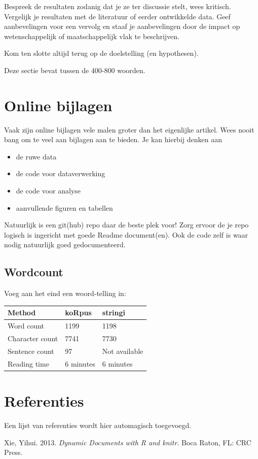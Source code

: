\documentclass[
]{article}
\providecommand{\tightlist}{%
  \setlength{\itemsep}{0pt}\setlength{\parskip}{0pt}}
\newlength{\cslhangindent}
\newlength{\cslentryspacingunit} %
\newenvironment{CSLReferences}[2] %
 {%
  \setlength{\parindent}{0pt}
  \ifodd #1
  \let\oldpar\par
  \def\par{\hangindent=\cslhangindent\oldpar}
  \fi
  \setlength{\parskip}{#2\cslentryspacingunit}
 }%
 {}
\begin{document}
Bespreek de resultaten zodanig dat je ze ter discussie stelt, wees kritisch. Vergelijk je resultaten met de literatuur of eerder ontwikkelde data. Geef aanbevelingen voor een vervolg en staaf je aanbevelingen door de impact op wetenschappelijk of maatschappelijk vlak te beschrijven.

Kom ten slotte altijd terug op de doelstelling (en hypothesen).

Deze sectie bevat tussen de 400-800 woorden.

\hypertarget{online-bijlagen}{%
\section{Online bijlagen}\label{online-bijlagen}}

Vaak zijn online bijlagen vele malen groter dan het eigenlijke artikel. Wees nooit bang om te veel aan bijlagen aan te bieden. Je kan hierbij denken aan

\begin{itemize}
\tightlist
\item
  de ruwe data
\item
  de code voor dataverwerking
\item
  de code voor analyse
\item
  aanvullende figuren en tabellen
\end{itemize}

Natuurlijk is een git(hub) repo daar de beste plek voor!
Zorg ervoor de je repo logisch is ingericht met goede Readme document(en).
Ook de code zelf is waar nodig natuurlijk goed gedocumenteerd.

\hypertarget{wordcount}{%
\subsection{Wordcount}\label{wordcount}}

Voeg aan het eind een woord-telling in:

\begin{tabular}{l|l|l}
\hline
Method & koRpus & stringi\\
\hline
Word count & 1199 & 1198\\
\hline
Character count & 7741 & 7730\\
\hline
Sentence count & 97 & Not available\\
\hline
Reading time & 6 minutes & 6 minutes\\
\hline
\end{tabular}

\hypertarget{referenties}{%
\section{Referenties}\label{referenties}}

Een lijst van referenties wordt hier automagisch toegevoegd.

\hypertarget{refs}{}
\begin{CSLReferences}{1}{0}
\leavevmode{}%
Xie, Yihui. 2013. \emph{Dynamic Documents with R and knitr}. Boca Raton, FL: CRC Press.

\end{CSLReferences}
\end{document}
